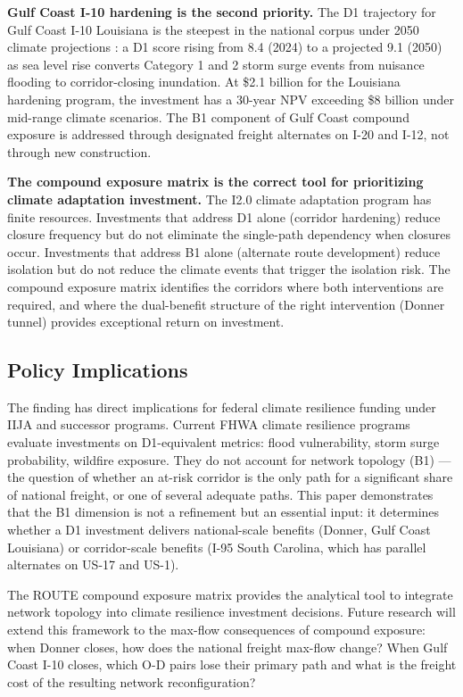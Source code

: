 \textbf{Gulf Coast I-10 hardening is the second priority.} The D1 trajectory for Gulf Coast I-10 Louisiana is the steepest in the national corpus under 2050 climate projections \citep{NOAA_SLR2022}: a D1 score rising from 8.4 (2024) to a projected 9.1 (2050) as sea level rise converts Category 1 and 2 storm surge events from nuisance flooding to corridor-closing inundation. At \$2.1 billion for the Louisiana hardening program, the investment has a 30-year NPV exceeding \$8 billion under mid-range climate scenarios. The B1 component of Gulf Coast compound exposure is addressed through designated freight alternates on I-20 and I-12, not through new construction.

\textbf{The compound exposure matrix is the correct tool for prioritizing climate adaptation investment.} The I2.0 climate adaptation program has finite resources. Investments that address D1 alone (corridor hardening) reduce closure frequency but do not eliminate the single-path dependency when closures occur. Investments that address B1 alone (alternate route development) reduce isolation but do not reduce the climate events that trigger the isolation risk. The compound exposure matrix identifies the corridors where both interventions are required, and where the dual-benefit structure of the right intervention (Donner tunnel) provides exceptional return on investment.

\subsection*{Policy Implications}

The finding has direct implications for federal climate resilience funding under IIJA and successor programs. Current FHWA climate resilience programs evaluate investments on D1-equivalent metrics: flood vulnerability, storm surge probability, wildfire exposure. They do not account for network topology (B1) --- the question of whether an at-risk corridor is the only path for a significant share of national freight, or one of several adequate paths. This paper demonstrates that the B1 dimension is not a refinement but an essential input: it determines whether a D1 investment delivers national-scale benefits (Donner, Gulf Coast Louisiana) or corridor-scale benefits (I-95 South Carolina, which has parallel alternates on US-17 and US-1).

The ROUTE compound exposure matrix provides the analytical tool to integrate network topology into climate resilience investment decisions. Future research \citep{ROUTE_C2} will extend this framework to the max-flow consequences of compound exposure: when Donner closes, how does the national freight max-flow change? When Gulf Coast I-10 closes, which O-D pairs lose their primary path and what is the freight cost of the resulting network reconfiguration?

